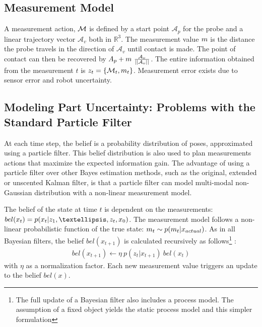 \documentclass[../thesis.tex]{subfiles}
\begin{document}
\subsection{Measurement Model}


A measurement action, $\mathcal{M}$ is defined by a start point $\mathcal{A}_p$ for the probe and a linear trajectory vector $\mathcal{A}_v$ both in $\mathbb{R}^3$. 
The measurement value $m$ is the distance the probe travels in the direction of $\mathcal{A}_v$ until contact is made. 
The point of contact can then be recovered by $A_p + m \  \frac{\mathcal{A}_v}{||\mathcal{A}_v||}$. 
The entire information obtained from the measurement $t$ is $z_t = \{\mathcal{M}_t, m_t\}$.
Measurement error exists due to sensor error and robot uncertainty. 


\subsection{Modeling Part Uncertainty: Problems with the Standard Particle Filter} 

At each time step, the belief is a probability distribution of poses, approximated using a particle filter. 
This belief distribution is also used to plan measurements actions that maximize the expected information gain. 
The advantage of using a particle filter over other Bayes estimation methods, such as the original\cite{kalman1960new}, extended\cite{kalman1961new} or unscented\cite{julier1997new} Kalman filter, is that a particle filter can model multi-modal non-Gaussian distribution with a non-linear measurement model.


The belief of the state at time $t$ is dependent on the measurements: $bel(x_t) = p(x_t| z_1, \textellipsis, z_t, x_0)$. The measurement model follows a non-linear probabilistic function of the true state: $m_t \sim p(m_t|x_{actual})$. 
As in all Bayesian filters, the belief $bel(x_{t+1})$ is calculated recursively as follows\footnote{The full update of a Bayesian filter also includes a process model.
The assumption of a fixed object yields the static process model and this simpler formulation} \cite{Thrun2000}:
\begin{align}
bel(x_{t+1}) \leftarrow \eta \ p(z_t|x_{t+1}) \  bel(x_t)
\end{align}
with $\eta$ as a normalization factor. Each new measurement value triggers an update to the belief $bel(x)$. 
\end{document}
